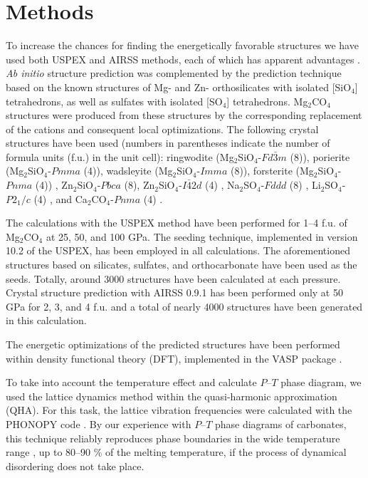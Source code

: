 \documentclass[a4paperm]{article}
\begin{document}
		\section*{Methods}

To increase the chances for finding the energetically favorable structures we have used both USPEX and AIRSS methods, each of which has apparent advantages \cite{oganov2019}.
{\it Ab initio} structure prediction was complemented by the prediction technique based on the known structures of Mg- and Zn- orthosilicates with isolated [SiO$_4$] tetrahedrons, as well as sulfates with isolated [SO$_4$] tetrahedrons. 
Mg$_2$CO$_4$ structures were produced from these structures by the corresponding replacement of the cations and consequent local optimizations.
The following crystal structures have been used (numbers in parentheses indicate the number of formula units (f.u.) in the unit cell): 
ringwodite (Mg$_2$SiO$_4$-$Fd\bar{3}m$ (8)),  
porierite (Mg$_2$SiO$_4$-$Pmma$ (4)), 
wadsleyite (Mg$_2$SiO$_4$-$Imma$ (8)), 
forsterite (Mg$_2$SiO$_4$-$Pnma$ (4)) \cite{smyth1973},
 Zn$_2$SiO$_4$-$Pbca$ (8), 
 Zn$_2$SiO$_4$-$I\bar{4}2d$ (4) \cite{kanzaki2019}, Na$_2$SO$_4$-$Fddd$ (8) \cite{hawthorne1975}, Li$_2$SO$_4$-$P2_1/c$ (4) \cite{alcock1973}, and Ca$_2$CO$_4$-$Pnma$ (4) \cite{sagatova2020_ortho}.
 
The calculations with the USPEX method \cite{uspex1,uspex2,uspex3,uspex_topology} have been performed for 1--4 f.u. of Mg$_2$CO$_4$ at 25, 50, and 100 GPa.
The seeding technique, implemented in version 10.2 of the USPEX, has been employed in all calculations.
The aforementioned structures based on silicates, sulfates, and orthocarbonate have been used as the seeds.
Totally, around 3000 structures have been calculated at each pressure.
Crystal structure prediction with AIRSS 0.9.1 \cite{airss1,airss2} has been performed only at 50 GPa for 2, 3, and 4 f.u. and a total of nearly 4000 structures have been generated in this calculation.

The energetic optimizations of the predicted structures have been performed within density functional theory (DFT), implemented in the VASP package \cite{vasp1,vasp2}.

To take into account the temperature effect and calculate $P$--$T$ phase diagram, we used the lattice dynamics method within the quasi-harmonic approximation (QHA).
For this task, the lattice vibration frequencies were calculated with the PHONOPY code \cite{phonopy}.
By our experience with $P$--$T$ phase diagrams of carbonates, this technique reliably reproduces phase boundaries in the wide temperature range \cite{gavr2019_alk, gavr2020_disarag, sagatova2020_ortho}, up to 80--90 \% of the melting temperature, if the process of dynamical disordering does not take place.
\end{document}
